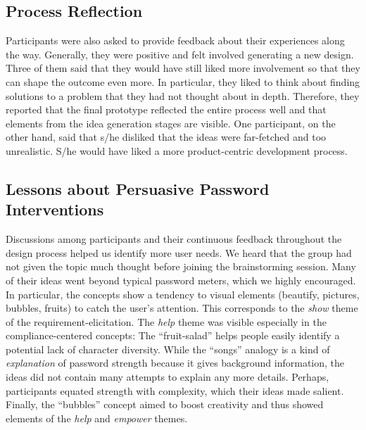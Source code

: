\subsection{Process Reflection}
Participants were also asked to provide feedback about their experiences along the way. Generally, they were positive and felt involved generating a new design. Three of them said that they would have still liked more involvement so that they can shape the outcome even more. In particular, they liked to think about finding solutions to a problem that they had not thought about in depth. Therefore, they reported that the final prototype reflected the entire process well and that elements from the idea generation stages are visible. One participant, on the other hand, said that s/he disliked that the ideas were far-fetched and too unrealistic. S/he would have liked a more product-centric development process.

\subsection{Lessons about Persuasive Password Interventions}
Discussions among participants and their continuous feedback throughout the design process helped us identify more user needs. We heard that the group had not given the topic much thought before joining the brainstorming session. Many of their ideas went beyond typical password meters, which we highly encouraged. In particular, the concepts show a tendency to visual elements (beautify, pictures, bubbles, fruits) to catch the user's attention. This corresponds to the \textit{show} theme of the requirement-elicitation. The \textit{help} theme was visible especially in the compliance-centered concepts: The ``fruit-salad'' helps people easily identify a potential lack of character diversity. 
While the ``songs'' analogy is a kind of \textit{explanation} of password strength because it gives background information, the ideas did not contain many attempts to explain any more details. Perhaps, participants equated strength with complexity, which their ideas made salient. Finally, the ``bubbles'' concept aimed to boost creativity and thus showed elements of the \textit{help} and \textit{empower} themes. 


